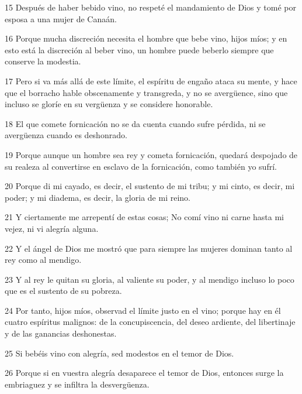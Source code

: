 \par 15 Después de haber bebido vino, no respeté el mandamiento de Dios y tomé por esposa a una mujer de Canaán.

\par 16 Porque mucha discreción necesita el hombre que bebe vino, hijos míos; y en esto está la discreción al beber vino, un hombre puede beberlo siempre que conserve la modestia.

\par 17 Pero si va más allá de este límite, el espíritu de engaño ataca su mente, y hace que el borracho hable obscenamente y transgreda, y no se avergüence, sino que incluso se gloríe en su vergüenza y se considere honorable.

\par 18 El que comete fornicación no se da cuenta cuando sufre pérdida, ni se avergüenza cuando es deshonrado.

\par 19 Porque aunque un hombre sea rey y cometa fornicación, quedará despojado de su realeza al convertirse en esclavo de la fornicación, como también yo sufrí.

\par 20 Porque di mi cayado, es decir, el sustento de mi tribu; y mi cinto, es decir, mi poder; y mi diadema, es decir, la gloria de mi reino.

\par 21 Y ciertamente me arrepentí de estas cosas; No comí vino ni carne hasta mi vejez, ni vi alegría alguna.

\par 22 Y el ángel de Dios me mostró que para siempre las mujeres dominan tanto al rey como al mendigo.

\par 23 Y al rey le quitan su gloria, al valiente su poder, y al mendigo incluso lo poco que es el sustento de su pobreza.

\par 24 Por tanto, hijos míos, observad el límite justo en el vino; porque hay en él cuatro espíritus malignos: de la concupiscencia, del deseo ardiente, del libertinaje y de las ganancias deshonestas.

\par 25 Si bebéis vino con alegría, sed modestos en el temor de Dios.

\par 26 Porque si en vuestra alegría desaparece el temor de Dios, entonces surge la embriaguez y se infiltra la desvergüenza.


